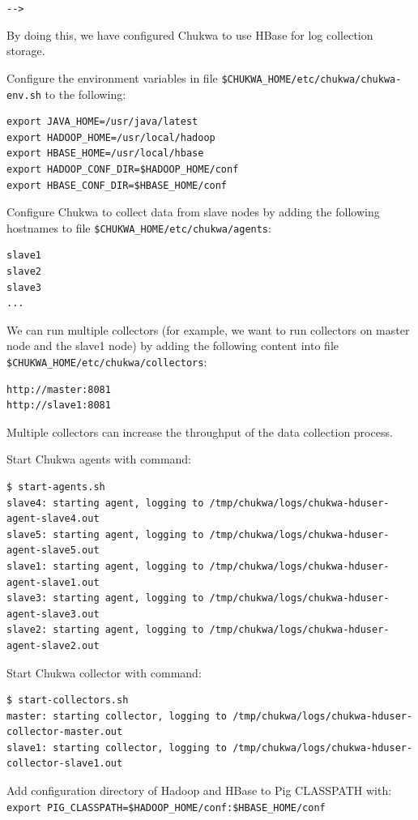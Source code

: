 \verb|-->|

By doing this, we have configured Chukwa to use HBase for log collection storage.

Configure the environment variables in file \verb|$CHUKWA_HOME/etc/chukwa/chukwa-env.sh| to the following: 
\lstset{style=bashstyle}
\begin{lstlisting}
export JAVA_HOME=/usr/java/latest
export HADOOP_HOME=/usr/local/hadoop
export HBASE_HOME=/usr/local/hbase
export HADOOP_CONF_DIR=$HADOOP_HOME/conf
export HBASE_CONF_DIR=$HBASE_HOME/conf
\end{lstlisting}

Configure Chukwa to collect data from slave nodes by adding the following hostnames to file \verb|$CHUKWA_HOME/etc/chukwa/agents|: 
\begin{verbatim}
slave1
slave2
slave3
...
\end{verbatim}

We can run multiple collectors (for example, we want to run collectors on master node and the slave1 node) by adding the following content into file \verb|$CHUKWA_HOME/etc/chukwa/collectors|: 
\begin{verbatim}
http://master:8081
http://slave1:8081
\end{verbatim}

Multiple collectors can increase the throughput of the data collection process.

Start Chukwa agents with command: 
\lstset{style=bashstyle,language=bash}
\begin{lstlisting}
$ start-agents.sh
slave4: starting agent, logging to /tmp/chukwa/logs/chukwa-hduser-agent-slave4.out
slave5: starting agent, logging to /tmp/chukwa/logs/chukwa-hduser-agent-slave5.out
slave1: starting agent, logging to /tmp/chukwa/logs/chukwa-hduser-agent-slave1.out
slave3: starting agent, logging to /tmp/chukwa/logs/chukwa-hduser-agent-slave3.out
slave2: starting agent, logging to /tmp/chukwa/logs/chukwa-hduser-agent-slave2.out
\end{lstlisting}

Start Chukwa collector with command: 
\lstset{style=bashstyle}
\begin{lstlisting}
$ start-collectors.sh
master: starting collector, logging to /tmp/chukwa/logs/chukwa-hduser-collector-master.out
slave1: starting collector, logging to /tmp/chukwa/logs/chukwa-hduser-collector-slave1.out
\end{lstlisting}

Add configuration directory of Hadoop and HBase to Pig CLASSPATH with: \\
\verb|export PIG_CLASSPATH=$HADOOP_HOME/conf:$HBASE_HOME/conf|

